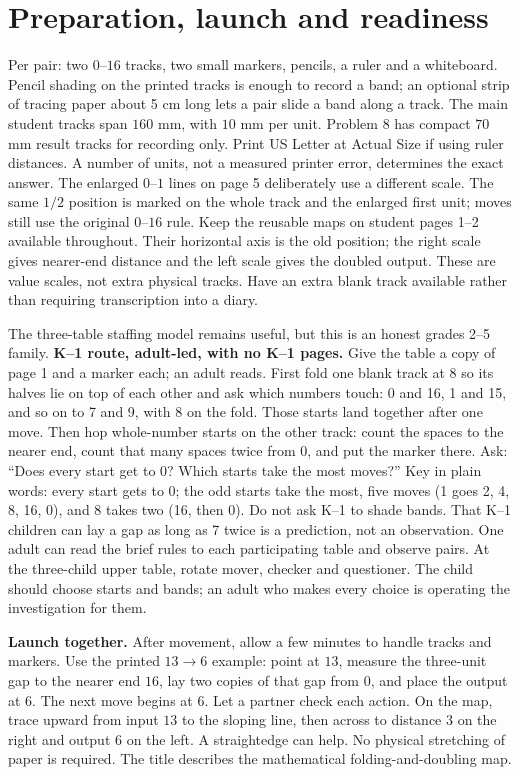 \documentclass[11pt,letterpaper]{article}
\begin{document}
\section*{Preparation, launch and readiness}
Per pair: two $0$--$16$ tracks, two small markers, pencils, a ruler and a whiteboard. Pencil shading on the printed tracks is enough to record a band; an optional strip of tracing paper about 5 cm long lets a pair slide a band along a track. The main student tracks span $160$ mm, with $10$ mm per unit. Problem 8 has compact $70$ mm result tracks for recording only. Print US Letter at Actual Size if using ruler distances. A number of units, not a measured printer error, determines the exact answer. The enlarged $0$--$1$ lines on page 5 deliberately use a different scale. The same $1/2$ position is marked on the whole track and the enlarged first unit; moves still use the original $0$--$16$ rule. Keep the reusable maps on student pages 1--2 available throughout. Their horizontal axis is the old position; the right scale gives nearer-end distance and the left scale gives the doubled output. These are value scales, not extra physical tracks. Have an extra blank track available rather than requiring transcription into a diary.

The three-table staffing model remains useful, but this is an honest grades 2--5 family. \textbf{K--1 route, adult-led, with no K--1 pages.} Give the table a copy of page 1 and a marker each; an adult reads. First fold one blank track at 8 so its halves lie on top of each other and ask which numbers touch: 0 and 16, 1 and 15, and so on to 7 and 9, with 8 on the fold. Those starts land together after one move. Then hop whole-number starts on the other track: count the spaces to the nearer end, count that many spaces twice from 0, and put the marker there. Ask: ``Does every start get to 0? Which starts take the most moves?'' Key in plain words: every start gets to 0; the odd starts take the most, five moves (1 goes 2, 4, 8, 16, 0), and 8 takes two (16, then 0). Do not ask K--1 to shade bands. That K--1 children can lay a gap as long as 7 twice is a prediction, not an observation. One adult can read the brief rules to each participating table and observe pairs. At the three-child upper table, rotate mover, checker and questioner. The child should choose starts and bands; an adult who makes every choice is operating the investigation for them.

\textbf{Launch together.} After movement, allow a few minutes to handle tracks and markers. Use the printed $13\to6$ example: point at $13$, measure the three-unit gap to the nearer end $16$, lay two copies of that gap from $0$, and place the output at $6$. The next move begins at $6$. Let a partner check each action. On the map, trace upward from input $13$ to the sloping line, then across to distance $3$ on the right and output $6$ on the left. A straightedge can help. No physical stretching of paper is required. The title describes the mathematical folding-and-doubling map.
\end{document}
